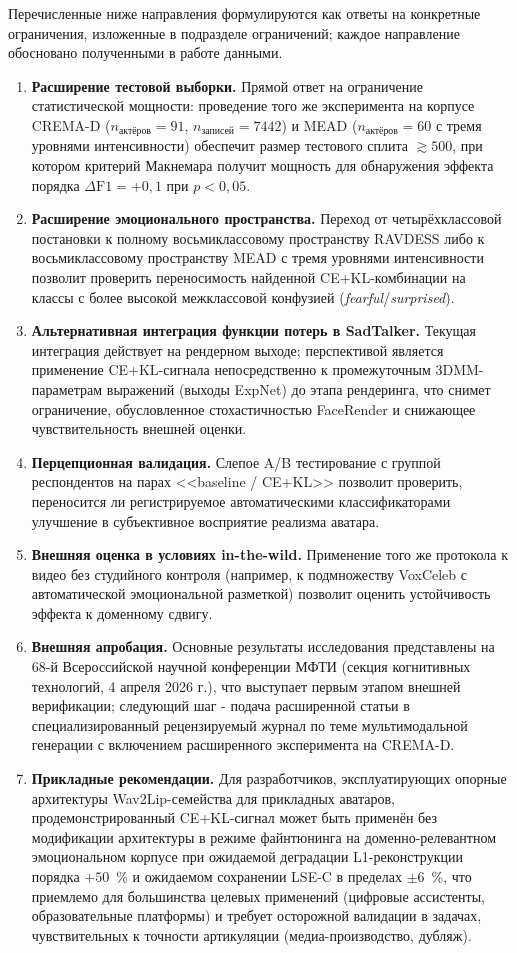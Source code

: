 \documentclass[a4paper, 12pt, oneside, openany]{article}
\begin{document}
Перечисленные ниже направления формулируются как ответы на конкретные ограничения, изложенные в подразделе ограничений; каждое направление обосновано полученными в работе данными.

\begin{enumerate}
\item \textbf{Расширение тестовой выборки.} Прямой ответ на ограничение статистической мощности: проведение того же эксперимента на корпусе CREMA-D ($n_{\text{актёров}}=91$, $n_{\text{записей}}=7442$) и MEAD ($n_{\text{актёров}}=60$ с тремя уровнями интенсивности) обеспечит размер тестового сплита $\gtrsim 500$, при котором критерий Макнемара получит мощность для обнаружения эффекта порядка $\Delta\text{F1}=+0{,}1$ при $p<0{,}05$.
\item \textbf{Расширение эмоционального пространства.} Переход от четырёхклассовой постановки к полному восьмиклассовому пространству RAVDESS либо к восьмиклассовому пространству MEAD с тремя уровнями интенсивности позволит проверить переносимость найденной CE+KL-комбинации на классы с более высокой межклассовой конфузией (\textit{fearful}/\textit{surprised}).
\item \textbf{Альтернативная интеграция функции потерь в SadTalker.} Текущая интеграция действует на рендерном выходе; перспективой является применение CE+KL-сигнала непосредственно к промежуточным 3DMM-параметрам выражений (выходы ExpNet) до этапа рендеринга, что снимет ограничение, обусловленное стохастичностью FaceRender и снижающее чувствительность внешней оценки.
\item \textbf{Перцепционная валидация.} Слепое A/B тестирование с группой респондентов на парах <<baseline / CE+KL>> позволит проверить, переносится ли регистрируемое автоматическими классификаторами улучшение в субъективное восприятие реализма аватара.
\item \textbf{Внешняя оценка в условиях in-the-wild.} Применение того же протокола к видео без студийного контроля (например, к подмножеству VoxCeleb с автоматической эмоциональной разметкой) позволит оценить устойчивость эффекта к доменному сдвигу.
\item \textbf{Внешняя апробация.} Основные результаты исследования представлены на 68-й Всероссийской научной конференции МФТИ (секция когнитивных технологий, 4 апреля 2026 г.), что выступает первым этапом внешней верификации; следующий шаг - подача расширенной статьи в специализированный рецензируемый журнал по теме мультимодальной генерации с включением расширенного эксперимента на CREMA-D.
\item \textbf{Прикладные рекомендации.} Для разработчиков, эксплуатирующих опорные архитектуры Wav2Lip-семейства для прикладных аватаров, продемонстрированный CE+KL-сигнал может быть применён без модификации архитектуры в режиме файнтюнинга на доменно-релевантном эмоциональном корпусе при ожидаемой деградации L1-реконструкции порядка $+50$~\% и ожидаемом сохранении LSE-C в пределах $\pm 6$~\%, что приемлемо для большинства целевых применений (цифровые ассистенты, образовательные платформы) и требует осторожной валидации в задачах, чувствительных к точности артикуляции (медиа-производство, дубляж).
\end{enumerate}
\end{document}
